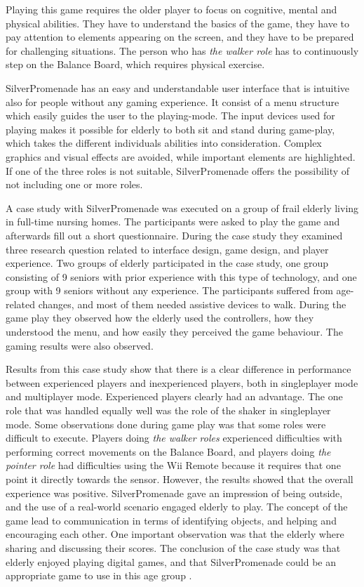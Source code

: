 Playing this game requires the older player to focus on cognitive, mental and physical abilities. They have to understand the basics of the game, they have to pay attention to elements appearing on the screen, and they have to be prepared for challenging situations. The person who has \emph{the walker role} has to continuously step on the Balance Board, which requires physical exercise.

SilverPromenade has an easy and understandable user interface that is intuitive also for people without any gaming experience. It consist of a menu structure which easily guides the user to the playing-mode. The input devices used for playing makes it possible for elderly to both sit and stand during game-play, which takes the different individuals abilities into consideration. Complex graphics and visual effects are avoided, while important elements are highlighted. If one of the three roles is not suitable, SilverPromenade offers the possibility of not including one or more roles.

A case study with SilverPromenade was executed on a group of frail elderly living in full-time nursing homes. The participants were asked to play the game and afterwards fill out a short questionnaire. During the case study they examined three research question related to interface design, game design, and player experience. Two groups of elderly participated in the case study, one group consisting of 9 seniors with prior experience with this type of technology, and one group with 9 seniors without any experience. The participants suffered from age-related changes, and most of them needed assistive devices to walk. During the game play they observed how the elderly used the controllers, how they understood the menu, and how easily they perceived the game behaviour. The gaming results were also observed.

Results from this case study show that there is a clear difference in performance between experienced players and inexperienced players, both in singleplayer mode and multiplayer mode. Experienced players clearly had an advantage. The one role that was handled equally well was the role of the shaker in singleplayer mode. Some observations done during game play was that some roles were difficult to execute. Players doing \emph{the walker roles} experienced difficulties with performing correct movements on the Balance Board, and players doing \emph{the pointer role} had difficulties using the Wii Remote because it requires that one point it directly towards the sensor. However, the results showed that the overall experience was positive. SilverPromenade gave an impression of being outside, and the use of a real-world scenario engaged elderly to play. The concept of the game lead to communication in terms of identifying objects, and helping and encouraging each other. One important observation was that the elderly where sharing and discussing their scores. The conclusion of the case study was that elderly enjoyed playing digital games, and that SilverPromenade could be an appropriate game to use in this age group \cite{gerling2}.

